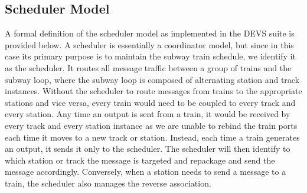 \subsection{Scheduler Model}
A formal definition of the scheduler model as implemented in the DEVS suite is provided below.  A scheduler is essentially a coordinator model, but since in this case its primary purpose is to maintain the subway train schedule, we identify it as the scheduler. It routes all message traffic between a group of trains and the subway loop, where the subway loop is composed of alternating station and track instances.  Without the scheduler to route messages from trains to the appropriate stations and vice versa, every train would need to be coupled to every track and every station.  Any time an output is sent from a train, it would be received by every track and every station instance as we are unable to rebind the train ports each time it moves to a new track or station. Instead, each time a train generates an output, it sends it only to the scheduler.  The scheduler will then identify to which station or track the message is targeted and repackage and send the message accordingly. Conversely, when a station needs to send a message to a train, the scheduler also manages the reverse association.  
%
